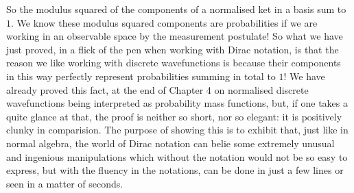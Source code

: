 So the modulus squared of the components of a normalised ket in a basis sum to $1$. We know these modulus squared components are probabilities if we are working in an observable space by the measurement postulate! So what we have just proved, in a flick of the pen when working with Dirac notation, is that the reason we like working with discrete wavefunctions is because their components in this way perfectly represent probabilities summing in total to $1$! We have already proved this fact, at the end of Chapter 4 on normalised discrete wavefunctions being interpreted as probability mass functions, but, if one takes a quite glance at that, the proof is neither so short, nor so elegant: it is positively clunky in comparision. The purpose of showing this is to exhibit that, just like in normal algebra, the world of Dirac notation can belie some extremely unusual and ingenious manipulations which without the notation would not be so easy to express, but with the fluency in the notations, can be done in just a few lines or seen in a matter of seconds. 
